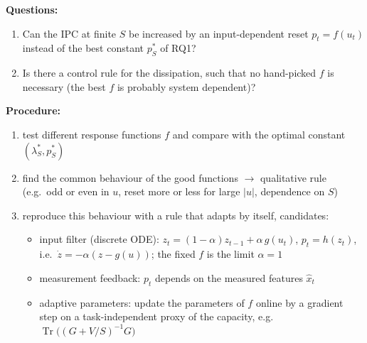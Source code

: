 \textbf{Questions:}
\begin{enumerate}
    \item Can the IPC at finite $S$ be increased by an input-dependent reset $p_t = f(u_t)$ instead of the best
    constant $p^*_S$ of RQ1?
    \item Is there a control rule for the dissipation, such that no hand-picked $f$ is necessary (the best $f$ is
    probably system dependent)?
\end{enumerate}

\textbf{Procedure:}
\begin{enumerate}
    \item test different response functions $f$ and compare with the optimal constant $(\lambda^*_S, p^*_S)$
    \item find the common behaviour of the good functions $\to$ qualitative rule (e.g.\ odd or even in $u$, reset
    more or less for large $\lvert u\rvert$, dependence on $S$)
    \item reproduce this behaviour with a rule that adapts by itself, candidates:
    \begin{itemize}
        \item input filter (discrete ODE): $z_t = (1-\alpha) z_{t-1} + \alpha\, g(u_t)$, $p_t = h(z_t)$, i.e.\
        $\dot z = -\alpha (z - g(u))$; the fixed $f$ is the limit $\alpha = 1$
        \item measurement feedback: $p_t$ depends on the measured features $\hat x_t$
        \item adaptive parameters: update the parameters of $f$ online by a gradient step on a task-independent
        proxy of the capacity, e.g.\ $\operatorname{Tr}\big((G + V/S)^{-1} G\big)$
    \end{itemize}
\end{enumerate}

